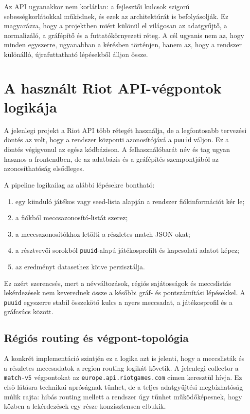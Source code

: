﻿\documentclass[a4paper,12pt]{report}
\begin{document}
Az API ugyanakkor nem korlátlan: a fejlesztői kulcsok szigorú sebességkorlátokkal működnek, és ezek az architektúrát is befolyásolják. Ez magyarázza, hogy a projektben miért különül el világosan az adatgyűjtő, a normalizáló, a gráfépítő és a futtatókörnyezeti réteg. A cél ugyanis nem az, hogy minden egyszerre, ugyanabban a kérésben történjen, hanem az, hogy a rendszer különálló, újrafuttatható lépésekből álljon össze.

\section{A használt Riot API-végpontok logikája}

A jelenlegi projekt a Riot API több rétegét használja, de a legfontosabb tervezési döntés az volt, hogy a rendszer központi azonosítójává a \texttt{puuid} váljon. Ez a döntés végigvonul az egész kódbázison. A felhasználóbarát név és tag ugyan hasznos a frontendben, de az adatbázis és a gráfépítés szempontjából az azonosíthatóság elsődleges.

A pipeline logikailag az alábbi lépésekre bontható:

\begin{enumerate}
    \item egy kiinduló játékos vagy seed-lista alapján a rendszer fiókinformációt kér le;
    \item a fiókból meccsazonosító-listát szerez;
    \item a meccsazonosítókhoz letölti a részletes match JSON-okat;
    \item a résztvevői sorokból \texttt{puuid}-alapú játékosprofilt és kapcsolati adatot képez;
    \item az eredményt datasethez kötve perzisztálja.
\end{enumerate}

Ez azért szerencsés, mert a névváltozások, régiós sajátosságok és meccslistás lekérdezések nem keverednek össze a későbbi gráf- és pontszámítási lépésekkel. A \texttt{puuid} egyszerre stabil összekötő kulcs a nyers meccsadat, a játékosprofil és a gráfcsúcs között.

\subsection{Régiós routing és végpont-topológia}

A konkrét implementáció szintjén ez a logika azt is jelenti, hogy a meccslisták és a részletes meccsadatok a region routing logikát követik. A jelenlegi collector a \texttt{match-v5} végpontokat az \texttt{europe.api.riotgames.com} címen keresztül hívja. Ez első látásra technikai apróságnak tűnhet, de a teljes adatgyűjtési megbízhatóság múlik rajta: hibás routing mellett a rendszer úgy tűnhet működőképesnek, hogy közben a lekérdezések egy része konzisztensen elbukik.
\end{document}
